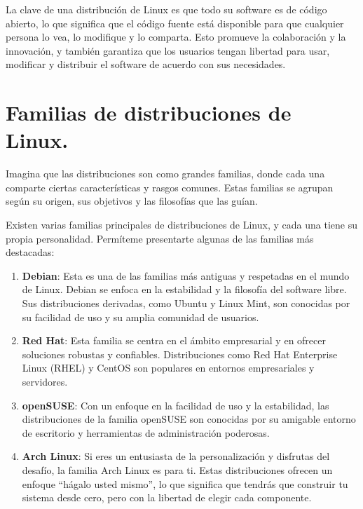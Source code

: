 \documentclass[
  jou,
  floatsintext,
  longtable,
  a4paper,
  nolmodern,
  notxfonts,
  notimes,
  12pt,
  colorlinks=true,linkcolor=blue,citecolor=blue,urlcolor=blue]{apa7}
\begin{document}
La clave de una distribución de Linux es que todo su software es de
código abierto, lo que significa que el código fuente está disponible
para que cualquier persona lo vea, lo modifique y lo comparta. Esto
promueve la colaboración y la innovación, y también garantiza que los
usuarios tengan libertad para usar, modificar y distribuir el software
de acuerdo con sus necesidades.

\section{Familias de distribuciones de
Linux.}\label{familias-de-distribuciones-de-linux.}

Imagina que las distribuciones son como grandes familias, donde cada una
comparte ciertas características y rasgos comunes. Estas familias se
agrupan según su origen, sus objetivos y las filosofías que las guían.

Existen varias familias principales de distribuciones de Linux, y cada
una tiene su propia personalidad. Permíteme presentarte algunas de las
familias más destacadas:

\begin{enumerate}
\def\labelenumi{\arabic{enumi}.}
\item
  \textbf{Debian}: Esta es una de las familias más antiguas y respetadas
  en el mundo de Linux. Debian se enfoca en la estabilidad y la
  filosofía del software libre. Sus distribuciones derivadas, como
  Ubuntu y Linux Mint, son conocidas por su facilidad de uso y su amplia
  comunidad de usuarios.
\item
  \textbf{Red Hat}: Esta familia se centra en el ámbito empresarial y en
  ofrecer soluciones robustas y confiables. Distribuciones como Red Hat
  Enterprise Linux (RHEL) y CentOS son populares en entornos
  empresariales y servidores.
\item
  \textbf{openSUSE}: Con un enfoque en la facilidad de uso y la
  estabilidad, las distribuciones de la familia openSUSE son conocidas
  por su amigable entorno de escritorio y herramientas de administración
  poderosas.
\item
  \textbf{Arch Linux}: Si eres un entusiasta de la personalización y
  disfrutas del desafío, la familia Arch Linux es para ti. Estas
  distribuciones ofrecen un enfoque ``hágalo usted mismo'', lo que
  significa que tendrás que construir tu sistema desde cero, pero con la
  libertad de elegir cada componente.
\end{enumerate}
\end{document}
